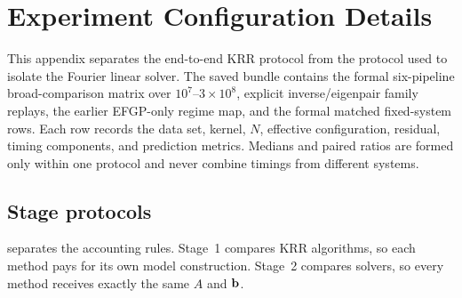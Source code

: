 \section{Experiment Configuration Details}
\label{app:experiment-details}

This appendix separates the end-to-end KRR protocol from the protocol used to
isolate the Fourier linear solver.  The saved bundle contains the formal
six-pipeline broad-comparison matrix over \(10^7\)--\(3\times10^8\), explicit
inverse/eigenpair family replays, the earlier EFGP-only regime map, and the
formal matched fixed-system rows.  Each row records the
data set, kernel, \(N\), effective configuration, residual, timing components,
and prediction metrics.  Medians and paired ratios are formed only within one
protocol and never combine timings from different systems.

\subsection{Stage protocols}

 separates the accounting rules.  Stage~1
compares KRR algorithms, so each method pays for its own model
construction.  Stage~2 compares solvers, so every method receives exactly the
same \(A\) and \(\mathbf b\).

